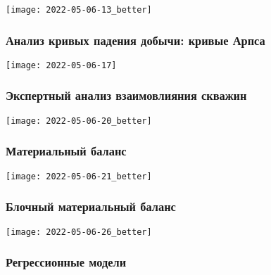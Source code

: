 \documentclass[main.tex]{subfiles}
\begin{document}
\texttt{[image: 2022-05-06-13\_better]}





\subsubsection{Анализ кривых падения добычи: кривые Арпса}

\texttt{[image: 2022-05-06-17]}



\subsubsection{Экспертный анализ взаимовлияния скважин}

\texttt{[image: 2022-05-06-20\_better]}

\subsubsection{Материальный баланс}

\texttt{[image: 2022-05-06-21\_better]}





\subsubsection{Блочный материальный баланс}

\texttt{[image: 2022-05-06-26\_better]}



\subsubsection{Регрессионные модели}
\end{document}
